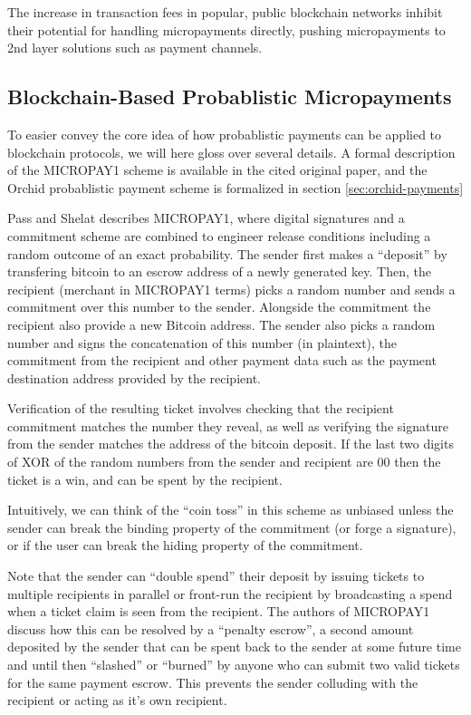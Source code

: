 The increase in transaction fees in popular, public blockchain networks inhibit their potential for handling micropayments directly, pushing micropayments to 2nd layer solutions such as payment channels.

\subsection{Blockchain-Based Probablistic Micropayments}

To easier convey the core idea of how probablistic payments can be applied to blockchain protocols, we will here gloss over several details. A formal description of the MICROPAY1 scheme is available in the cited original paper, and the Orchid probablistic payment scheme is formalized in section \ref{sec:orchid-payments}

Pass and Shelat describes MICROPAY1\cite{Micropayments}, where digital signatures and a commitment scheme are combined to engineer release conditions including a random outcome of an exact probability. The sender first makes a ``deposit'' by transfering bitcoin to an escrow address of a newly generated key. Then, the recipient (merchant in MICROPAY1 terms) picks a random number and sends a commitment over this number to the sender. Alongside the commitment the recipient also provide a new Bitcoin address. The sender also picks a random number and signs the concatenation of this number (in plaintext), the commitment from the recipient and other payment data such as the payment destination address provided by the recipient.

Verification of the resulting ticket involves checking that the recipient commitment matches the number they reveal, as well as verifying the signature from the sender matches the address of the bitcoin deposit. If the last two digits of XOR of the random numbers from the sender and recipient are 00 then the ticket is a win, and can be spent by the recipient.

Intuitively, we can think of the ``coin toss'' in this scheme as unbiased unless the sender can break the binding property of the commitment (or forge a signature), or if the user can break the hiding property of the commitment.

Note that the sender can ``double spend'' their deposit by issuing tickets to multiple recipients in parallel or front-run the recipient by broadcasting a spend when a ticket claim is seen from the recipient. The authors of MICROPAY1 discuss how this can be resolved by a ``penalty escrow'', a second amount deposited by the sender that can be spent back to the sender at some future time and until then  ``slashed'' or ``burned'' by anyone who can submit two valid tickets for the same payment escrow. This prevents the sender colluding with the recipient or acting as it's own recipient.


